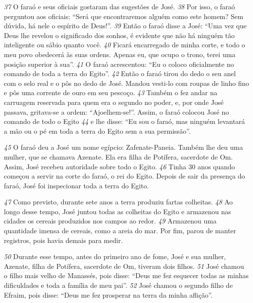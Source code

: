 \bigskip   
\textit{\tiny 37}
O  faraó e seus oficiais gostaram das sugestões de José. 
\textit{\tiny 38}
Por isso, o faraó
perguntou aos oficiais: “Será que encontraremos alguém como este homem? Sem
dúvida, há nele o espírito de Deus!”. 
\textit{\tiny 39}
Então o faraó disse a José: “Uma vez que
Deus lhe revelou o significado dos sonhos, é evidente que não há ninguém tão
inteligente ou sábio quanto você. 
\textit{\tiny 40}
Ficará encarregado de minha corte, e todo o
meu povo obedecerá às suas ordens. Apenas eu, que ocupo o trono, terei uma
posição superior à sua”.
\textit{\tiny 41}
O faraó acrescentou: “Eu o coloco oficialmente no comando de toda a terra
do Egito”. 
\textit{\tiny 42}
Então o faraó tirou do dedo o seu anel com o selo real e o pôs no dedo
de José. Mandou vesti-lo com roupas de linho fino e pôs uma corrente de ouro em
seu pescoço. 
\textit{\tiny 43}
Também o fez andar na carruagem reservada para quem era o
segundo no poder, e, por onde José passava, gritava-se a ordem: “Ajoelhem-se!”.
Assim, o faraó colocou José no comando de todo o Egito 
\textit{\tiny 44}
e lhe disse: “Eu sou o
faraó, mas ninguém levantará a mão ou o pé em toda a terra do Egito sem a sua
permissão”.

\bigskip   
\textit{\tiny 45}
O faraó deu a José um nome egípcio: Zafenate-Paneia.
 Também lhe deu
uma mulher, que se chamava Azenate. Ela era filha de Potífera, sacerdote de
Om. Assim, José recebeu autoridade sobre todo o Egito. 
\textit{\tiny 46}
Tinha 30 anos
quando começou a servir na corte do faraó, o rei do Egito. Depois de sair da
presença do faraó, José foi inspecionar toda a terra do Egito.


\bigskip   
\textit{\tiny 47}
Como previsto, durante sete anos a terra produziu fartas colheitas. 
\textit{\tiny 48}
Ao
longo desse tempo, José juntou todas as colheitas do Egito e armazenou nas
cidades os cereais produzidos nos campos ao redor. 
\textit{\tiny 49}
Armazenou uma
quantidade imensa de cereais, como a areia do mar. Por fim, parou de manter
registros, pois havia demais para medir.

\bigskip   
\textit{\tiny 50}
Durante esse tempo, antes do primeiro ano de fome, José e sua mulher,
Azenate, filha de Potífera, sacerdote de Om, tiveram dois filhos. 
\textit{\tiny 51}
José chamou o
filho mais velho de Manassés,
 pois disse: “Deus me fez esquecer todas as
minhas dificuldades e toda a família de meu pai”. 
\textit{\tiny 52}
José chamou o segundo filho
de Efraim,
 pois disse: “Deus me fez prosperar na terra da minha aflição”.

